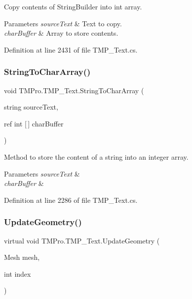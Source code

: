 Copy contents of String\+Builder into int array. 


\begin{DoxyParams}{Parameters}
{\em source\+Text} & Text to copy.\\
\hline
{\em char\+Buffer} & Array to store contents.\\
\hline
\end{DoxyParams}


Definition at line 2431 of file T\+M\+P\+\_\+\+Text.\+cs.

\mbox{\label{class_t_m_pro_1_1_t_m_p___text_added9ace8138f71b06a8a4df70ac8c6a}} 
\subsubsection{\texorpdfstring{StringToCharArray()}{StringToCharArray()}}
{\footnotesize\ttfamily void T\+M\+Pro.\+T\+M\+P\+\_\+\+Text.\+String\+To\+Char\+Array (\begin{DoxyParamCaption}\item[{string}]{source\+Text,  }\item[{ref int \mbox{[}$\,$\mbox{]}}]{char\+Buffer }\end{DoxyParamCaption})\hspace{0.3cm}{\ttfamily [protected]}}



Method to store the content of a string into an integer array. 


\begin{DoxyParams}{Parameters}
{\em source\+Text} & \\
\hline
{\em char\+Buffer} & \\
\hline
\end{DoxyParams}


Definition at line 2286 of file T\+M\+P\+\_\+\+Text.\+cs.

\mbox{\label{class_t_m_pro_1_1_t_m_p___text_a555f26eef9b5a5e51d27217c4c8adb8a}} 
\subsubsection{\texorpdfstring{UpdateGeometry()}{UpdateGeometry()}}
{\footnotesize\ttfamily virtual void T\+M\+Pro.\+T\+M\+P\+\_\+\+Text.\+Update\+Geometry (\begin{DoxyParamCaption}\item[{Mesh}]{mesh,  }\item[{int}]{index }\end{DoxyParamCaption})\hspace{0.3cm}{\ttfamily [virtual]}}



